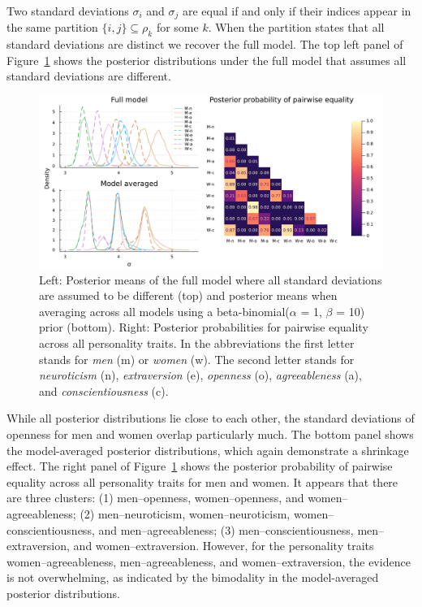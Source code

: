 \documentclass[11pt,a4paper]{article}
\theoremstyle{definition} %
\theoremstyle{case}
\newcommand{\partition}{\rho}
\begin{document}
Two standard deviations $\sigma_i$ and $\sigma_j$ are equal if and only if their indices appear in the same partition $\{i,j\}\subseteq\partition_k$ for some $k$.
When the partition states that all standard deviations are distinct we recover the full model. %
The top left panel of Figure~\ref{fig:demo_variances} shows the posterior distributions under the full model that assumes all standard deviations are different.
\begin{figure}
    \centering
    \includegraphics[width=\textwidth]{demo_variances_2panel_plot.pdf}
    \caption{Left: Posterior means of the full model where all standard deviations are assumed to be different (top) and posterior means when averaging across all models using a beta-binomial($\alpha$ = 1, $\beta$ = 10) prior (bottom).
    Right: Posterior probabilities for pairwise equality across all personality traits. In the abbreviations the first letter stands for \emph{men} (m) or \emph{women} (w). The second letter stands for \emph{neuroticism} (n), \emph{extraversion} (e), \emph{openness} (o), \emph{agreeableness} (a), and \emph{conscientiousness} (c).}
    \label{fig:demo_variances}
\end{figure}

While all posterior distributions lie close to each other, the standard deviations of openness for men and women overlap particularly much. The bottom panel shows the model-averaged posterior distributions, which again demonstrate a shrinkage effect. The right panel of Figure~\ref{fig:demo_variances} shows the posterior probability of pairwise equality across all personality traits for men and women. It appears that there are three clusters: (1) men--openness, women--openness, and women--agreeableness; (2) men--neuroticism, women--neuroticism, women--conscientiousness, and men--agreeableness; (3) men--conscientiousness, men--extraversion, and women--extraversion. However, for the personality traits women--agreeableness, men--agreeableness, and women--extraversion, the evidence is not overwhelming, as indicated by the bimodality in the model-averaged posterior distributions.
\end{document}
